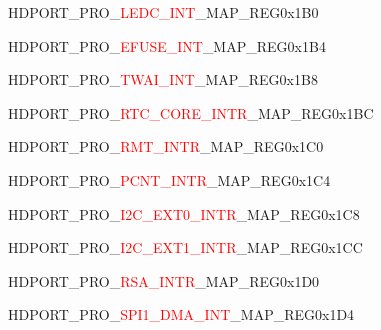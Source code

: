 \begin{register}{H}{DPORT\_PRO\_\textcolor{red}{LEDC\_INT}\_MAP\_REG}{0x1B0}\label{regdesc:PROLEDCINTMAPREG}
\end{register}
\vspace{-3em}
\begin{register}{H}{DPORT\_PRO\_\textcolor{red}{EFUSE\_INT}\_MAP\_REG}{0x1B4}\label{regdesc:PROEFUSEINTMAPREG}
\end{register}
\vspace{-3em}
\begin{register}{H}{DPORT\_PRO\_\textcolor{red}{TWAI\_INT}\_MAP\_REG}{0x1B8}\label{regdesc:PROCANINTMAPREG}
\end{register}
\vspace{-3em}
\begin{register}{H}{DPORT\_PRO\_\textcolor{red}{RTC\_CORE\_INTR}\_MAP\_REG}{0x1BC}\label{regdesc:PRORTCCOREINTRMAPREG}
\end{register}
\vspace{-3em}
\begin{register}{H}{DPORT\_PRO\_\textcolor{red}{RMT\_INTR}\_MAP\_REG}{0x1C0}\label{regdesc:PRORMTINTRMAPREG}
\end{register}
\vspace{-3em}
\begin{register}{H}{DPORT\_PRO\_\textcolor{red}{PCNT\_INTR}\_MAP\_REG}{0x1C4}\label{regdesc:PROPCNTINTRMAPREG}
\end{register}
\vspace{-3em}
\begin{register}{H}{DPORT\_PRO\_\textcolor{red}{I2C\_EXT0\_INTR}\_MAP\_REG}{0x1C8}\label{regdesc:PROI2CEXT0INTRMAPREG}
\end{register}
\vspace{-3em}
\begin{register}{H}{DPORT\_PRO\_\textcolor{red}{I2C\_EXT1\_INTR}\_MAP\_REG}{0x1CC}\label{regdesc:PROI2CEXT1INTRMAPREG}
\end{register}
\vspace{-3em}
\begin{register}{H}{DPORT\_PRO\_\textcolor{red}{RSA\_INTR}\_MAP\_REG}{0x1D0}\label{regdesc:PRORSAINTRMAPREG}
\end{register}
\vspace{-3em}
\begin{register}{H}{DPORT\_PRO\_\textcolor{red}{SPI1\_DMA\_INT}\_MAP\_REG}{0x1D4}\label{regdesc:PROSPI1DMAINTMAPREG}
\end{register}
\vspace{-3em}

